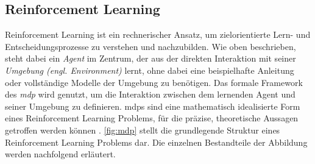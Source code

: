     
    
    
    


\subsection{Reinforcement Learning}
Reinforcement Learning ist ein rechnerischer Ansatz, um zielorientierte Lern- und Entscheidungsprozesse zu verstehen und nachzubilden.
Wie oben beschrieben, steht dabei ein \emph{Agent} im Zentrum, der aus der direkten Interaktion mit seiner \emph{Umgebung (engl. Environment)} lernt, ohne dabei eine beispielhafte Anleitung oder vollständige Modelle der Umgebung zu benötigen.
Das formale Framework des \emph{\acf{mdp}} wird genutzt, um die Interaktion zwischen dem lernenden Agent und seiner Umgebung zu definieren.
\acp{mdp} sind eine mathematisch idealisierte Form eines Reinforcement Learning Problems, für die präzise, theoretische Aussagen getroffen werden können \cite[13]{sutton2018rlintro}.
\autoref{fig:mdp} stellt die grundlegende Struktur eines Reinforcement Learning Problems dar.
Die einzelnen Bestandteile der Abbildung werden nachfolgend erläutert.

